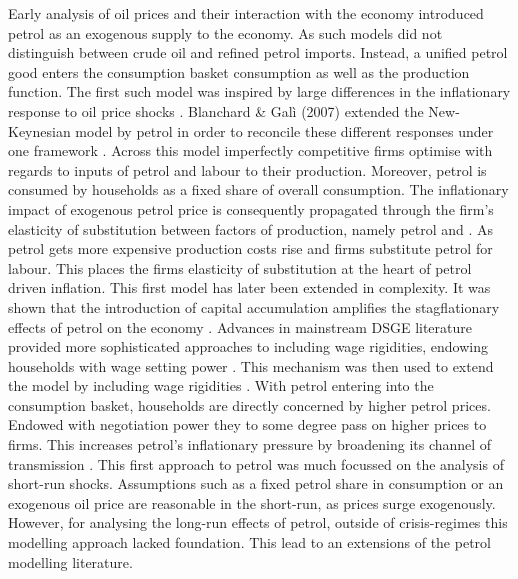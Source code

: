 \documentclass[12pt,a4paper,english]{article} %
\begin{document}
	Early analysis of oil prices and their interaction with the economy introduced petrol as an exogenous supply to the economy. As such models did not distinguish between crude oil and refined petrol imports. Instead, a unified petrol good enters the consumption basket consumption as well as the production function. The first such model was inspired by large differences in the inflationary response to oil price shocks \cite{blanchard_macroeconomic_2007}. Blanchard \& Galì (2007) extended the New-Keynesian model by petrol in order to reconcile these different responses under one framework \cite{blanchard_macroeconomic_2007}. Across this model imperfectly competitive firms optimise with regards to inputs of petrol and labour to their production. Moreover, petrol is consumed by households as a fixed share of overall consumption. The inflationary impact of exogenous petrol price is consequently propagated through the firm's elasticity of substitution between factors of production, namely petrol and \cite{blanchard_macroeconomic_2007}. As petrol gets more expensive production costs rise and firms substitute petrol for labour. This places the firms elasticity of substitution at the heart of petrol driven inflation. This first model has later been extended in complexity. It was shown that the introduction of capital accumulation amplifies the stagflationary effects of petrol on the economy \cite{acurio_vasconez_what_2015}. Advances in mainstream DSGE literature provided more sophisticated approaches to including wage rigidities, endowing households with wage setting power \cite{smets_shocks_2007}. This mechanism was then used to extend the model by including wage rigidities \cite{leduc_quantitative_2004}. With petrol entering into the consumption basket, households are directly concerned by higher petrol prices. Endowed with negotiation power they to some degree pass on higher prices to firms. This increases petrol's inflationary  pressure by broadening its channel of transmission \cite{leduc_quantitative_2004}.	This first approach to petrol was much focussed on the analysis of short-run shocks. Assumptions such as a fixed petrol share in consumption or an exogenous oil price are reasonable in the short-run, as prices surge exogenously. However, for analysing the long-run effects of petrol, outside of crisis-regimes this modelling approach lacked foundation. This lead to an extensions of the petrol modelling literature.
	
\end{document}
